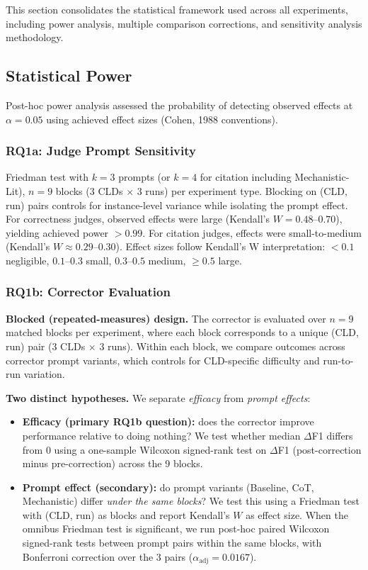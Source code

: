 This section consolidates the statistical framework used across all experiments, including power analysis, multiple comparison corrections, and sensitivity analysis methodology.

\subsection{Statistical Power}

Post-hoc power analysis assessed the probability of detecting observed effects at $\alpha = 0.05$ using achieved effect sizes (Cohen, 1988 conventions).

\subsubsection{RQ1a: Judge Prompt Sensitivity}
Friedman test with $k=3$ prompts (or $k=4$ for citation including Mechanistic-Lit), $n=9$ blocks (3 CLDs $\times$ 3 runs) per experiment type. Blocking on (CLD, run) pairs controls for instance-level variance while isolating the prompt effect. For correctness judges, observed effects were large (Kendall's $W = 0.48$--$0.70$), yielding achieved power $>0.99$. For citation judges, effects were small-to-medium (Kendall's $W \approx 0.29$--$0.30$). Effect sizes follow Kendall's W interpretation: $<0.1$ negligible, $0.1$--$0.3$ small, $0.3$--$0.5$ medium, $\geq 0.5$ large.

\subsubsection{RQ1b: Corrector Evaluation}
\textbf{Blocked (repeated-measures) design.} The corrector is evaluated over $n=9$ matched blocks per experiment, where each block corresponds to a unique (CLD, run) pair (3 CLDs $\times$ 3 runs). Within each block, we compare outcomes across corrector prompt variants, which controls for CLD-specific difficulty and run-to-run variation.

\textbf{Two distinct hypotheses.} We separate \textit{efficacy} from \textit{prompt effects}:
\begin{itemize}[noitemsep]
    \item \textbf{Efficacy (primary RQ1b question):} does the corrector improve performance relative to doing nothing? We test whether median $\Delta$F1 differs from 0 using a one-sample Wilcoxon signed-rank test on $\Delta$F1 (post-correction minus pre-correction) across the 9 blocks.
    \item \textbf{Prompt effect (secondary):} do prompt variants (Baseline, CoT, Mechanistic) differ \textit{under the same blocks}? We test this using a Friedman test with (CLD, run) as blocks and report Kendall's $W$ as effect size. When the omnibus Friedman test is significant, we run post-hoc paired Wilcoxon signed-rank tests between prompt pairs within the same blocks, with Bonferroni correction over the 3 pairs ($\alpha_{\text{adj}}=0.0167$).
\end{itemize}

